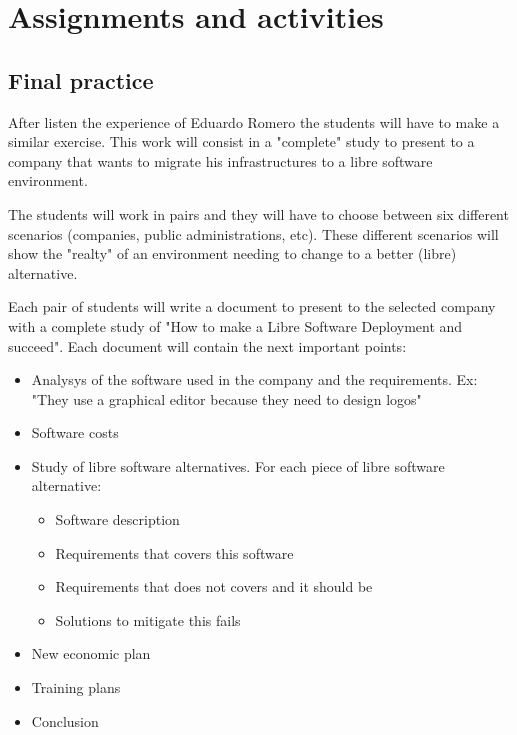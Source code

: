 \documentclass[a4paper]{article}
\begin{document}
\section{Assignments and activities}

\subsection{Final practice}

After listen the experience of Eduardo Romero the students will have to make a similar exercise. This work will consist in a "complete" study to present to a company that wants to migrate his infrastructures to a libre software environment. 

The students will work in pairs and they will have to choose between six different scenarios (companies, public administrations, etc). These different scenarios will show the "realty" of an environment needing to change to a better (libre) alternative. 

Each pair of students will write a document to present to the selected company with a complete study of "How to make a Libre Software Deployment and succeed". Each document will contain the next important points:

\begin{itemize}
\item Analysys of the software used in the company and the requirements. Ex: "They use a graphical editor because they need to design logos"
\item Software costs
\item Study of libre software alternatives. For each piece of libre software alternative:
	\begin{itemize}
	\item Software description
	\item Requirements that covers this software
	\item Requirements that does not covers and it should be
	\item Solutions to mitigate this fails
	\end{itemize}
\item New economic plan
\item Training plans 
\item Conclusion

\end{itemize}
\end{document}
